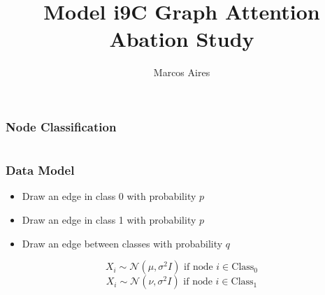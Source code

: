 \documentclass{beamer}
\title{Model i9C Graph Attention Abation Study}
\author{Marcos Aires}
\institute{University of Fortaleza}
\begin{document}
    \begin{frame}
    \titlepage
    \end{frame}

    \begin{frame}
    \frametitle{Node Classification}
    \begin{columns}
    \end{columns}
    \end{frame}

    \begin{frame}
    \frametitle{Data Model}
    \begin{itemize}
    \item Draw an edge in class 0 with probability $p$
    \item Draw an edge in class 1 with probability $p$
    \item Draw an edge between classes with probability $q$
    \end{itemize}

    \[ X_i \sim \mathcal{N}(\mu, \sigma^2I) \text{ if node } i \in \text{Class}_0 \]
    \[ X_i \sim \mathcal{N}(\nu, \sigma^2I) \text{ if node } i \in \text{Class}_1 \]
    \end{frame}

    
\end{document}
